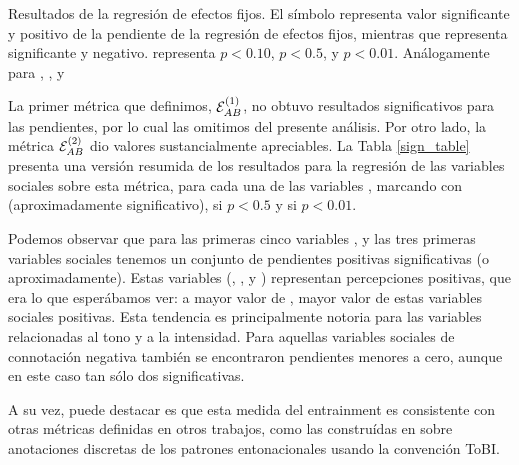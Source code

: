 
\begin{table}[t]

\caption{Resultados de la regresión de efectos fijos. El símbolo \psl representa valor significante y positivo de la pendiente de la regresión de efectos fijos, mientras que \nsl representa significante y negativo. \psl representa $p < 0.10$, \ppsl $p < 0.5$, y \pppsl $p < 0.01$. Análogamente para \nsl, \nnsl, y \nnnsl }
\label{sign_table}
\end{table}

\newcommand{\slopeestim}[1] { $\estslope \sim #1$ }

La primer métrica que definimos, $\mathcal{E}_{AB}^{(1)}$, no obtuvo resultados significativos para las pendientes, por lo cual las omitimos del presente análisis. Por otro lado, la métrica $\mathcal{E}_{AB}^{(2)}$ dio valores sustancialmente apreciables. La Tabla \ref{sign_table} presenta una versión resumida de los resultados para la regresión de las variables sociales sobre esta métrica, para cada una de las variables \ap, marcando con \psl (aproximadamente significativo), \ppsl si $p < 0.5$ y \pppsl si $p < 0.01$.

Podemos observar que para las primeras cinco variables \ap, y las tres primeras variables sociales tenemos un conjunto de pendientes positivas significativas (o aproximadamente). Estas variables (\svcontributes, \svclear, y \svengaged) representan percepciones positivas, que era lo que esperábamos ver: a mayor valor de \entrainment, mayor valor de estas variables sociales positivas. Esta tendencia es principalmente notoria para las variables \ap relacionadas al tono y a la intensidad. Para aquellas variables sociales de connotación negativa también se encontraron pendientes menores a cero, aunque en este caso tan sólo dos significativas.

A su vez, puede  destacar es que esta medida del entrainment es consistente con otras métricas definidas en otros trabajos, como las construídas en \cite{gravano2015backward} sobre anotaciones discretas de los patrones entonacionales usando la convención ToBI\cite{pitrelli1994evaluation}.
